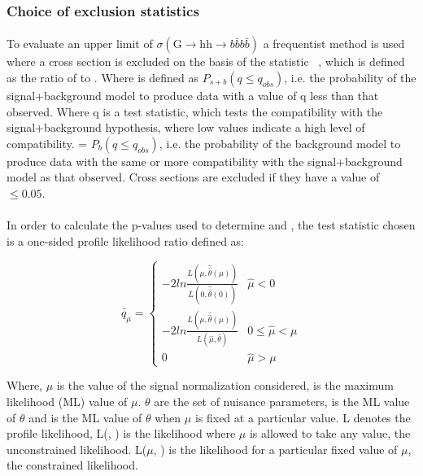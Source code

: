 
\subsubsection{Choice of exclusion statistics}

\paragraph{}
To evaluate an upper limit of $\sigma(\mathrm{G} \to{\mathrm{hh}}\to b\bar{b}b\bar{b})$  a frequentist method is used where a cross section is excluded on the basis of the statistic  \cls~\cite{Read:2002hq}, which is defined as the ratio of \clsb to \clb. Where \clsb is defined as $P_{s+b}(q \le q_{obs})$, i.e. the probability of the signal+background  model to produce data with a value of q less than that observed. Where q is a test statistic, which tests the compatibility with the signal+background hypothesis, where low values indicate a high level of compatibility. \clb = $P_{b}(q \le q_{obs})$, i.e. the probability of the background model to produce data with the same or more compatibility with the signal+background model as that observed. Cross sections are excluded if they have a value of \cls $\le 0.05$.  

\paragraph{}
In order to calculate the p-values used to determine \clsb and \clb, the test statistic chosen is a one-sided profile likelihood ratio defined as:

\begin{equation}
  \widetilde{q_{\mu}} =
  \begin{cases}
    -2ln \frac{L(\mu,\hat{\hat{\theta}}(\mu))}{L(0,\hat{\hat{\theta}}(0))} & \hat{\mu} < 0 \\
    -2ln \frac{L(\mu,\hat{\hat{\theta}}(\mu))}{L(\hat{\mu},\hat{\theta})} & 0 \le \hat{\mu} < \mu \\
    0 & \hat{\mu} > \mu
  \end{cases} 
\end{equation}

\noindent 
Where, $\mu$ is the value of the signal normalization considered, \muhat is the maximum likelihood (ML) value of $\mu$. $\theta$ are the set of nuisance parameters, \thetahat is the ML value of $\theta$ and \thetahathat is the ML value of $\theta$ when $\mu$ is fixed at a particular value. L denotes the profile likelihood, L(\muhat, \thetahat) is the likelihood where $\mu$ is allowed to take any value, the unconstrained likelihood. L($\mu$, \thetahathat) is the likelihood for a particular fixed value of $\mu$, the constrained likelihood.

